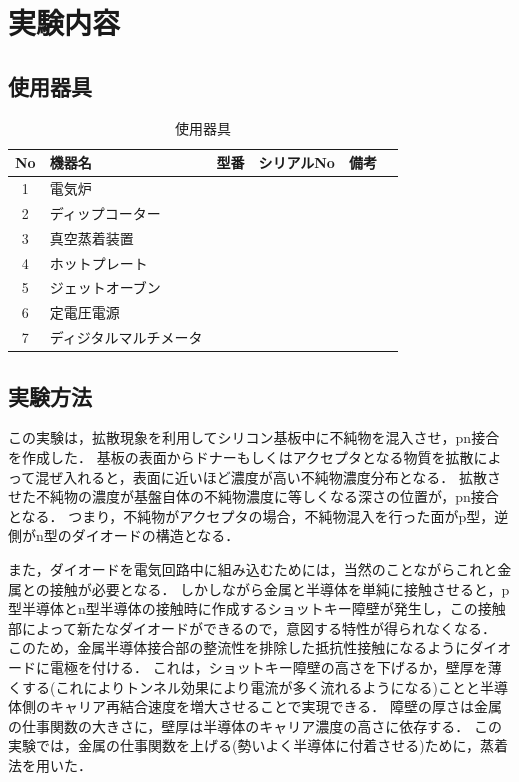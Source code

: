\documentclass[11pt]{jarticle}
\begin{document}
\section{実験内容}
	\subsection{使用器具}
		\begin{table}[H]
		\begin{center}
		\caption{使用器具}
		\label{tab:used}
		\begin{tabular}{clllll} \toprule
		No&\multicolumn{1}{l}{機器名}&\multicolumn{1}{l}{型番}&\multicolumn{1}{l}{シリアルNo}&\multicolumn{1}{l}{備考}\\ \hline
		1&電気炉&&&\\
		2&ディップコーター&&&\\
		3&真空蒸着装置&&&\\
		4&ホットプレート&&&\\
		5&ジェットオーブン&&&\\
		6&定電圧電源&&&\\
		7&ディジタルマルチメータ&&&\\ \bottomrule
		\end{tabular}
		\end{center}
		\end{table}

	\subsection{実験方法}
		この実験は，拡散現象を利用してシリコン基板中に不純物を混入させ，pn接合を作成した．
		基板の表面からドナーもしくはアクセプタとなる物質を拡散によって混ぜ入れると，表面に近いほど濃度が高い不純物濃度分布となる．
		拡散させた不純物の濃度が基盤自体の不純物濃度に等しくなる深さの位置が，pn接合となる．
		つまり，不純物がアクセプタの場合，不純物混入を行った面がp型，逆側がn型のダイオードの構造となる．

		また，ダイオードを電気回路中に組み込むためには，当然のことながらこれと金属との接触が必要となる．
		しかしながら金属と半導体を単純に接触させると，p型半導体とn型半導体の接触時に作成するショットキー障壁が発生し，この接触部によって新たなダイオードができるので，意図する特性が得られなくなる．
		このため，金属半導体接合部の整流性を排除した抵抗性接触になるようにダイオードに電極を付ける．
		これは，ショットキー障壁の高さを下げるか，壁厚を薄くする(これによりトンネル効果により電流が多く流れるようになる)ことと半導体側のキャリア再結合速度を増大させることで実現できる．
		障壁の厚さは金属の仕事関数の大きさに，壁厚は半導体のキャリア濃度の高さに依存する．
		この実験では，金属の仕事関数を上げる(勢いよく半導体に付着させる)ために，蒸着法を用いた．
\end{document}
